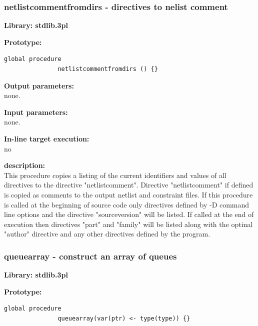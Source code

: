         \subsubsection{netlistcommentfromdirs - directives to nelist comment}\label{sec:lpncfromd}

            {\bf Library: stdlib.3pl}

            {\bf Prototype:} \\
            \vsp
            \begin{lstlisting}[gobble=12, language=threepl]
               global procedure
               netlistcommentfromdirs () {}
            \end{lstlisting}

            {\bf Output parameters:} \\
            none.

            {\bf Input parameters:} \\            
            none.
        
            {\bf In-line target execution:} \\
            no

            {\bf description:} \\
            This procedure copies a listing of the current identifiers and values
            of all directives to the directive "netlistcomment". Directive
            "netlistcomment" if defined is copied as comments to the output netlist
            and constraint files. If this procedure is called at the beginning
            of source code only directives defined by -D command line options
            and the directive "sourceversion" will be listed. If called at the end
            of execution then directives "part" and "family" will be listed
            along with the optinal "author" directive and any other directives
            defined by the program.


        \subsubsection{queuearray - construct an array of queues}\label{sec:lpqueuearray}

            {\bf Library: stdlib.3pl}

            {\bf Prototype:} \\
            \vsp
            \begin{lstlisting}[gobble=12, language=threepl]
               global procedure
               queuearray(var(ptr) <- type(type)) {}
            \end{lstlisting}


